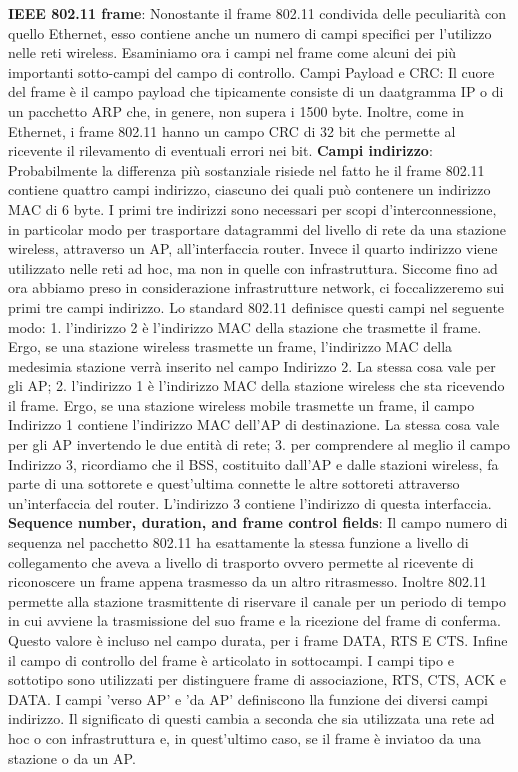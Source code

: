 \documentclass[a4paper,10pt]{article} %
\renewcommand{\b}[1]{%
    {\textbf{#1}}}
\begin{document}
\b{IEEE 802.11 frame}: Nonostante il frame 802.11 condivida delle peculiarità con quello Ethernet, esso contiene anche un numero di campi specifici per l'utilizzo nelle reti wireless. Esaminiamo ora i campi nel frame come alcuni dei più importanti sotto-campi del campo di controllo.  Campi Payload e CRC: Il cuore del frame è il campo payload che tipicamente consiste di un daatgramma IP o di  un pacchetto ARP che, in genere, non supera i 1500 byte. Inoltre, come in Ethernet, i frame 802.11 hanno un campo CRC di 32 bit che permette al ricevente il rilevamento di eventuali errori nei bit.  \b{Campi indirizzo}: Probabilmente la differenza più sostanziale risiede nel fatto he il frame 802.11 contiene quattro campi indirizzo, ciascuno dei quali può contenere un indirizzo MAC di 6 byte. I primi tre indirizzi sono necessari per scopi d'interconnessione, in particolar modo per trasportare datagrammi del livello di rete da una stazione wireless, attraverso un AP, all'interfaccia router. Invece il quarto indirizzo viene utilizzato nelle reti ad hoc, ma non in quelle con infrastruttura. Siccome fino ad ora abbiamo preso in considerazione infrastrutture network, ci foccalizzeremo sui primi tre campi indirizzo. Lo standard 802.11 definisce questi campi nel seguente modo: 1. l'indirizzo 2 è l'indirizzo MAC della stazione che trasmette il frame. Ergo, se una stazione wireless trasmette un frame, l'indirizzo MAC della medesimia stazione verrà inserito nel campo Indirizzo 2. La stessa cosa vale per gli AP; 2. l'indirizzo 1 è l'indirizzo MAC della stazione wireless che sta ricevendo il frame. Ergo, se una stazione wireless mobile trasmette un frame, il campo Indirizzo 1 contiene l'indirizzo MAC dell'AP di destinazione. La stessa cosa vale per gli AP invertendo le due entità di rete; 3. per comprendere al meglio il campo Indirizzo 3, ricordiamo che il BSS, costituito dall'AP e dalle stazioni wireless, fa parte di una sottorete e quest'ultima connette le altre sottoreti attraverso un'interfaccia del router. L'indirizzo 3 contiene l'indirizzo di questa interfaccia.  \b{Sequence number, duration, and frame control fields}: Il campo numero di sequenza nel pacchetto 802.11 ha esattamente la stessa funzione a livello di collegamento che aveva a livello di trasporto ovvero permette al ricevente di riconoscere un frame appena trasmesso da un altro ritrasmesso. Inoltre 802.11 permette alla stazione trasmittente di riservare il canale per un periodo di tempo in cui avviene la trasmissione del suo frame e la ricezione del frame di conferma. Questo valore è incluso nel campo durata, per i frame DATA, RTS E CTS. Infine il campo di controllo del frame è articolato in sottocampi. I campi tipo e sottotipo sono utilizzati per distinguere frame di associazione, RTS, CTS, ACK e DATA. I campi 'verso AP' e 'da AP' definiscono lla funzione dei diversi campi indirizzo. Il significato di questi cambia a seconda che sia utilizzata una rete ad hoc o con infrastruttura e, in quest'ultimo caso, se il frame è inviatoo da una stazione o da un AP.
\end{document}
